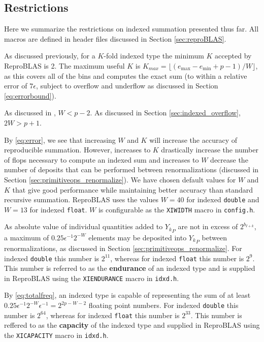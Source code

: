 \subsection{Restrictions}
    \label{sec:primitiveops_restrictions}
    Here we summarize the restrictions on indexed summation presented thus far. All macros are defined in header files discussed in Section \ref{sec:reproBLAS}.

    As discussed previously, for a $K$-fold indexed type the minimum $K$
    accepted by ReproBLAS is 2. The maximum useful $K$ is
    $K_{max}=\lfloor(e_{\max} - e_{\min} + p - 1)/W\rfloor$,
    as this covers all of the bins and computes the exact sum (to within a relative error of $7 \epsilon$, subject to overflow and underflow as discussed in Section \ref{eq:errorbound}).

    As discussed in \cite{repsum}, $W < p - 2$. As discussed in Section
    \ref{sec:indexed_overflow}, $2 W > p + 1$.

    By \eqref{eq:error}, we see that increasing $W$ and $K$ will increase
    the accuracy of reproducible summation. However, increases to $K$ drastically increase the number of flops necessary to compute an indexed sum and increases to $W$ decrease the number of deposits that can be performed between renormalizations (discussed in Section \ref{sec:primitiveops_renormalize}).
    We have chosen default values for $W$ and $K$ that give good performance while maintaining better accuracy than standard recursive summation.
    ReproBLAS uses the values $W = 40$ for indexed \texttt{double} and $W = 13$
    for indexed \texttt{float}. $W$ is configurable as the \texttt{XIWIDTH} macro in \texttt{config.h}.

    As absolute value of individual quantities added to ${Y_k}_P$ are not in
    excess of $2^{b_{I + k}}$, a maximum of $0.25\epsilon^{-1}2^{-W}$ elements
    may be deposited into ${Y_k}_P$ between renormalizations, as discussed in
    Section \ref{sec:primitiveops_renormalize}. For indexed \texttt{double}
    this number is $2^{11}$, whereas for indexed \texttt{float} this number is
    $2^9$. This number is referred to as the \textbf{endurance} of an indexed type and is supplied in ReproBLAS using the
    \texttt{XIENDURANCE} macro in \texttt{idxd.h}.

    By \eqref{eq:totalfreq}, an indexed type is capable of representing the sum
    of at least $0.25\epsilon^{-1}2^{-W}  \epsilon^{-1} = 2^{2  p - W - 2}$
    floating point numbers. For indexed \texttt{double} this number is
    $2^{64}$, whereas for indexed \texttt{float} this number is
    $2^{33}$. This number is reffered to as the \textbf{capacity} of the indexed type and supplied in ReproBLAS using the
    \texttt{XICAPACITY} macro in \texttt{idxd.h}.

